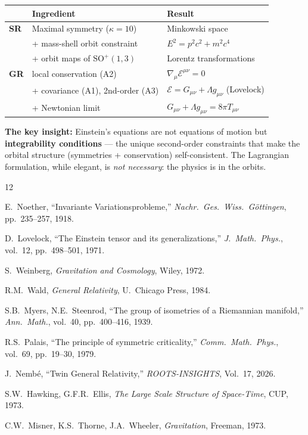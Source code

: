 \documentclass[11pt,twocolumn]{article}
\theoremstyle{plain}\newtheorem{theorem}{Theorem}\newtheorem{proposition}[theorem]{Proposition}\newtheorem{corollary}[theorem]{Corollary}\newtheorem{lemma}[theorem]{Lemma}
\theoremstyle{definition}\newtheorem{definition}[theorem]{Definition}
\theoremstyle{remark}\newtheorem{remark}[theorem]{Remark}
\begin{document}
\begin{center}\small
\begin{tabular}{lll}\toprule
& \textbf{Ingredient} & \textbf{Result} \\\midrule
\textbf{SR} & Maximal symmetry ($\kappa = 10$) & Minkowski space \\
& + mass-shell orbit constraint & $E^2 = p^2c^2 + m^2c^4$ \\
& + orbit maps of $\mathrm{SO}^+(1,3)$ & Lorentz transformations \\
\midrule
\textbf{GR} & local conservation (A2) & $\nabla_\mu\mathcal{E}^{\mu\nu} = 0$ \\
& + covariance (A1), 2nd-order (A3) & $\mathcal{E} = G_{\mu\nu} + \Lambda g_{\mu\nu}$ (Lovelock) \\
& + Newtonian limit & $G_{\mu\nu} + \Lambda g_{\mu\nu} = 8\pi T_{\mu\nu}$ \\
\bottomrule
\end{tabular}
\end{center}

\textbf{The key insight:} Einstein's equations are not equations of motion but \textbf{integrability conditions} --- the unique second-order constraints that make the orbital structure (symmetries + conservation) self-consistent. The Lagrangian formulation, while elegant, is \emph{not necessary}: the physics is in the orbits.


\begin{thebibliography}{12}

 E.~Noether, ``Invariante Variationsprobleme,'' \emph{Nachr.\ Ges.\ Wiss.\ G\"ottingen}, pp.~235--257, 1918.

 D.~Lovelock, ``The Einstein tensor and its generalizations,'' \emph{J.\ Math.\ Phys.}, vol.~12, pp.~498--501, 1971.

 S.~Weinberg, \emph{Gravitation and Cosmology}, Wiley, 1972.

 R.M.~Wald, \emph{General Relativity}, U.~Chicago Press, 1984.

 S.B.~Myers, N.E.~Steenrod, ``The group of isometries of a Riemannian manifold,'' \emph{Ann.\ Math.}, vol.~40, pp.~400--416, 1939.

 R.S.~Palais, ``The principle of symmetric criticality,'' \emph{Comm.\ Math.\ Phys.}, vol.~69, pp.~19--30, 1979.

 J.~Nemb\'e, ``Twin General Relativity,'' \emph{ROOTS-INSIGHTS}, Vol.~17, 2026.

 S.W.~Hawking, G.F.R.~Ellis, \emph{The Large Scale Structure of Space-Time}, CUP, 1973.

 C.W.~Misner, K.S.~Thorne, J.A.~Wheeler, \emph{Gravitation}, Freeman, 1973.

\end{thebibliography}
\end{document}
